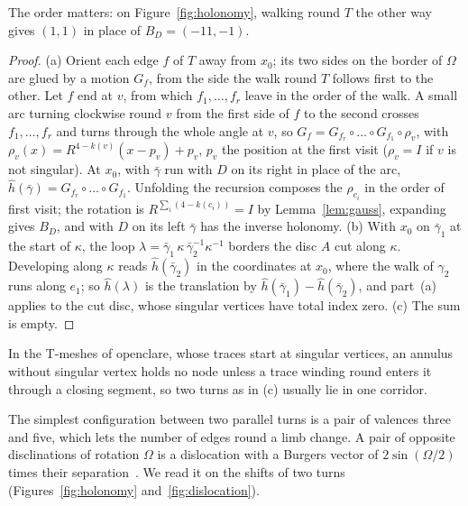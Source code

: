\documentclass[11pt,a4paper]{article}
\begin{document}
The order matters: on Figure~\ref{fig:holonomy}, walking round $T$ the other
way gives $(1, 1)$ in place of $B_D = (-11, -1)$.

\begin{proof}
(a) Orient each edge $f$ of $T$ away from $x_0$; its two sides on the border of
$\Omega$ are glued by a motion $G_f$, from the side the walk round $T$ follows
first to the other. Let $f$ end at $v$, from which $f_1, \dots, f_r$ leave in
the order of the walk. A small arc turning clockwise round $v$ from the first
side of $f$ to the second crosses $f_1, \dots, f_r$ and turns through the
whole angle at $v$, so $G_f = G_{f_r} \circ \dots \circ G_{f_1} \circ
\rho_v$, with $\rho_v(x) = R^{4-k(v)}(x - p_v) + p_v$, $p_v$ the position at
the first visit ($\rho_v = I$ if $v$ is not singular). At $x_0$, with
$\bar\gamma$ run with $D$ on its right in place of the arc, $\hat
h(\bar\gamma) = G_{f_r} \circ \dots \circ G_{f_1}$. Unfolding the
recursion composes the $\rho_{c_i}$ in the order of first visit; the rotation
is $R^{\sum_i(4 - k(c_i))} = I$ by Lemma~\ref{lem:gauss}, expanding gives
$B_D$, and with $D$ on its left $\bar\gamma$ has the inverse holonomy. (b) With $x_0$ on $\bar\gamma_1$ at the start of $\kappa$, the loop
$\lambda = \bar\gamma_1\, \kappa\, \bar\gamma_2^{-1} \kappa^{-1}$ borders the
disc $A$ cut along $\kappa$. Developing along $\kappa$ reads $\hat
h(\bar\gamma_2)$ in the coordinates at $x_0$, where the walk of $\gamma_2$
runs along $e_1$; so $\hat h(\lambda)$ is the translation by $\hat
h(\bar\gamma_1) - \hat h(\bar\gamma_2)$, and part~(a) applies to the cut disc,
whose singular vertices have total index zero. (c) The sum is empty.
\end{proof}

In the T-meshes of openclare, whose traces start at singular vertices, an
annulus without singular vertex holds no node unless a trace winding round
enters it through a closing segment, so two turns as in (c) usually lie in
one corridor.

The simplest configuration between two parallel turns is a pair of valences
three and five, which lets the number of edges round a limb change. A pair of
opposite disclinations of rotation $\Omega$ is a dislocation with a Burgers
vector of $2\sin(\Omega/2)$ times their
separation~\cite[Eq.~(5)]{kleman2008disclinations}. We read it
on the shifts of two turns (Figures~\ref{fig:holonomy}
and~\ref{fig:dislocation}).
\end{document}
